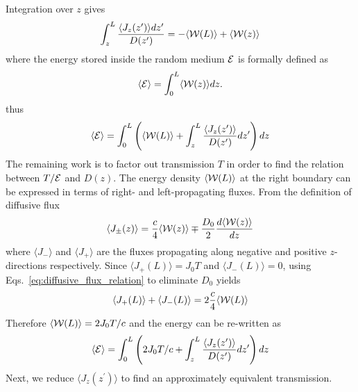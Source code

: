Integration over $z$ gives
\begin{equation}
\int_z^L\frac{\langle J_z(z^\prime)\rangle dz^\prime}{D(z^\prime)}=-\langle {\cal W}(L)\rangle + \langle {\cal W}(z)\rangle
\label{eq:E1_relation}
\end{equation}
where the energy stored inside the random medium ${\cal E}$ is formally defined as
\begin{equation}
\langle {\cal E} \rangle =\int_0^L\langle {\cal W}(z)\rangle dz.
\label{eq:Energy_definition_relation}
\end{equation}
thus
\begin{equation}
\langle {\cal E} \rangle = \int_0^L \left( \langle {\cal W}(L)\rangle + \int_z^L\frac{\langle J_z(z^\prime)\rangle }{D(z^\prime)}dz^\prime\right) dz
\end{equation}
The remaining work is to factor out transmission $T$ in order to find the relation between $T/{\cal E}$ and $D(z)$. The energy density $\langle {\cal W}(L)\rangle$ at the right boundary can be expressed in terms of right- and left-propagating fluxes. From the definition of diffusive flux \cite{1953_Morse}
\begin{equation}
\langle J_{\pm}(z)\rangle = \frac{c}{4} \langle {\cal W}(z)\rangle \mp \frac{D_0}{2} \frac{d\langle {\cal W}(z)\rangle }{dz}
\label{eq:diffusive_flux_relation}
\end{equation}
where $ \langle J_{-}\rangle$ and $ \langle J_{+}\rangle $ are the fluxes propagating along negative and positive $z$-directions respectively. Since $\langle J_+(L)\rangle=J_0T$ and $\langle J_-(L)\rangle=0$, using Eqs.~\ref{eq:diffusive_flux_relation} to eliminate $D_0$ yields
\begin{equation}
\langle J_+(L)\rangle + \langle J_-(L)\rangle = 2 \frac{c}{4}\langle {\cal W}(L)\rangle
\end{equation}
Therefore $\langle {\cal W}(L)\rangle=2J_0T/c$ and the energy can be re-written as
\begin{equation}
\langle {\cal E} \rangle = \int_0^L \left( 2J_0T/c + \int_z^L\frac{\langle J_z(z^\prime)\rangle}{D(z^\prime)}dz^\prime\right) dz
\end{equation}
Next, we reduce $\langle J_z(z^\prime)\rangle$ to find an approximately equivalent transmission.


